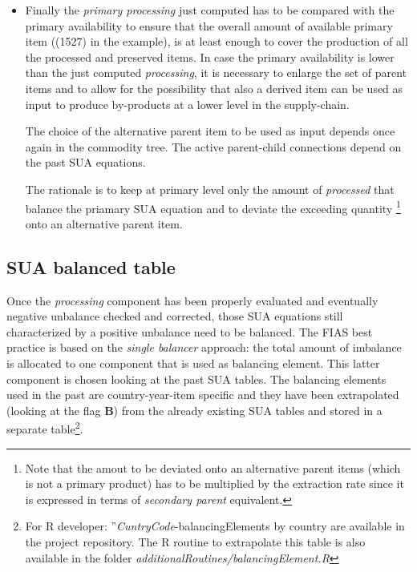 \documentclass[nojss]{jss}
\begin{document}
\begin{itemize}
\begin{table}[t]
\begin{tabular}{c|c|c|c|c|c}
\bottomrule
\end{tabular}
\label{tab:xxx}
\end{table}

\item Finally the \textit{primary processing} just computed has to be compared with the primary availability to ensure that the overall amount of available primary item ((1527) in the example), is at least enough to cover the production of all the processed and preserved items. In case the primary availability is lower than the just computed \textit{processing}, it is necessary to enlarge the set of parent items and to allow for the possibility that also a derived item can be used as input to produce by-products at a lower level in the supply-chain.

The choice of the alternative parent item to be used as input depends once again in the commodity tree. The active parent-child connections depend on the past SUA equations. 

The rationale is to keep at primary level only the amount of \textit{processed} that balance the priamary SUA equation and to deviate the exceeding quantity \footnote{Note that the amout to be deviated onto an alternative parent items (which is not a primary product) has to be multiplied by the extraction rate since it is expressed in terms of \textit{secondary parent} equivalent.} onto an alternative parent item.

\end{itemize}




\subsection{SUA balanced table}
Once the \textit{processing} component has been properly evaluated and eventually negative unbalance checked and corrected,  those SUA equations still characterized by a positive unbalance need to be balanced. The FIAS best practice is based on the \textit{single balancer} approach: the total amount of imbalance is allocated to one component that is used as balancing element. This latter component is chosen looking at the past SUA tables. The balancing elements used in the past are country-year-item specific and they have been extrapolated (looking at the flag \textbf{B}) from the already existing SUA tables and stored in a separate table\footnote{For R developer: ''\textit{CuntryCode}-balancingElements by country are available in the project repository. The R routine to extrapolate this table is also available in the folder \textit{additionalRoutines/balancingElement.R}}.
\end{document}
